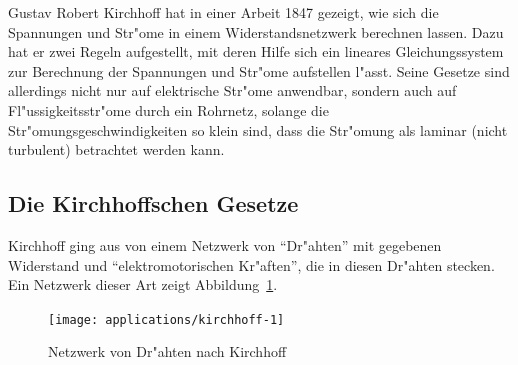 %
%
Gustav Robert Kirchhoff hat in einer Arbeit 1847 gezeigt, wie sich
die Spannungen und Str"ome in einem Widerstandsnetzwerk berechnen
lassen. Dazu hat er zwei Regeln aufgestellt, mit deren Hilfe
sich ein lineares Gleichungssystem zur Berechnung der Spannungen
und Str"ome aufstellen l"asst.
Seine Gesetze sind allerdings
nicht nur auf elektrische Str"ome anwendbar, sondern auch auf
Fl"ussigkeitsstr"ome durch ein Rohrnetz, solange die
Str"omungsgeschwindigkeiten so klein sind, dass die Str"omung als
laminar (nicht turbulent) betrachtet werden kann.

\subsection{Die Kirchhoffschen Gesetze}
Kirchhoff ging aus von einem Netzwerk von ``Dr"ahten'' mit gegebenen
Widerstand und ``elektromotorischen Kr"aften'', die in diesen
Dr"ahten stecken. Ein Netzwerk dieser Art zeigt
Abbildung~\ref{kirchhoff-netzwerk}.
\begin{figure}
\begin{center}
\texttt{[image: applications/kirchhoff-1]}
\end{center}
\caption{Netzwerk von Dr"ahten nach Kirchhoff\label{kirchhoff-netzwerk}}
\end{figure}

